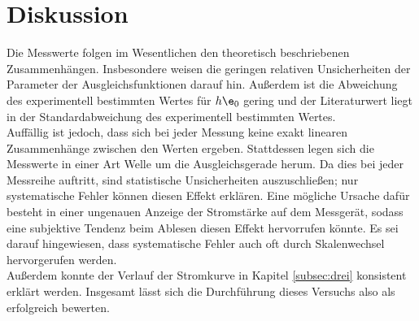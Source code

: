 \section{Diskussion}
\label{sec:Diskussion}
Die Messwerte folgen im Wesentlichen den theoretisch beschriebenen Zusammenhängen.
Insbesondere weisen die geringen relativen Unsicherheiten der Parameter der Ausgleichsfunktionen
darauf hin. Außerdem ist die Abweichung des experimentell bestimmten Wertes für
$h\e_0$ gering und der Literaturwert liegt in der Standardabweichung des experimentell
bestimmten Wertes. \\
Auffällig ist jedoch, dass sich bei jeder Messung keine exakt linearen Zusammenhänge
zwischen den Werten ergeben. Stattdessen legen sich die Messwerte in einer Art Welle
um die Ausgleichsgerade herum. Da dies bei jeder Messreihe auftritt, sind statistische
Unsicherheiten auszuschließen; nur systematische Fehler können diesen Effekt erklären.
Eine mögliche Ursache dafür besteht in einer ungenauen Anzeige der Stromstärke auf dem Messgerät, sodass
eine subjektive Tendenz beim Ablesen diesen Effekt hervorrufen könnte. Es sei darauf
hingewiesen, dass systematische Fehler auch oft durch Skalenwechsel hervorgerufen werden.\\
Außerdem konnte der Verlauf der Stromkurve in Kapitel \ref{subsec:drei} konsistent erklärt werden.
Insgesamt lässt sich die Durchführung dieses Versuchs also als erfolgreich bewerten.
